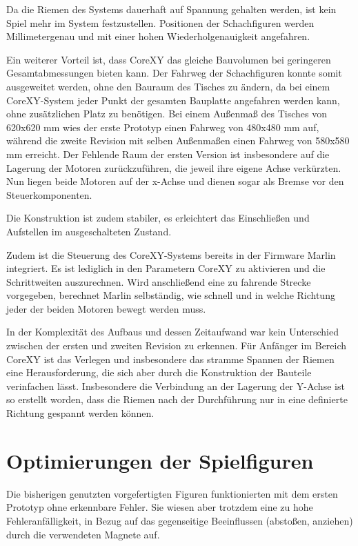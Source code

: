 Da die Riemen des Systems dauerhaft auf Spannung gehalten werden, ist
kein Spiel mehr im System festzustellen. Positionen der Schachfiguren
werden Millimetergenau und mit einer hohen Wiederholgenauigkeit
angefahren.

Ein weiterer Vorteil ist, dass CoreXY das gleiche Bauvolumen bei
geringeren Gesamtabmessungen bieten kann. Der Fahrweg der Schachfiguren
konnte somit ausgeweitet werden, ohne den Bauraum des Tisches zu ändern,
da bei einem CoreXY-System jeder Punkt der gesamten Bauplatte angefahren
werden kann, ohne zusätzlichen Platz zu benötigen. Bei einem Außenmaß
des Tisches von 620x620 mm wies der erste Prototyp einen Fahrweg von
480x480 mm auf, während die zweite Revision mit selben Außenmaßen einen
Fahrweg von 580x580 mm erreicht. Der Fehlende Raum der ersten Version
ist insbesondere auf die Lagerung der Motoren zurückzuführen, die jeweil
ihre eigene Achse verkürzten. Nun liegen beide Motoren auf der x-Achse
und dienen sogar als Bremse vor den Steuerkomponenten.

Die Konstruktion ist zudem stabiler, es erleichtert das Einschließen und
Aufstellen im ausgeschalteten Zustand.

Zudem ist die Steuerung des CoreXY-Systems bereits in der Firmware
Marlin integriert. Es ist lediglich in den Parametern CoreXY zu
aktivieren und die Schrittweiten auszurechnen. Wird anschließend eine zu
fahrende Strecke vorgegeben, berechnet Marlin selbständig, wie schnell
und in welche Richtung jeder der beiden Motoren bewegt werden muss.

In der Komplexität des Aufbaus und dessen Zeitaufwand war kein
Unterschied zwischen der ersten und zweiten Revision zu erkennen. Für
Anfänger im Bereich CoreXY ist das Verlegen und insbesondere das stramme
Spannen der Riemen eine Herausforderung, die sich aber durch die
Konstruktion der Bauteile verinfachen lässt. Insbesondere die Verbindung
an der Lagerung der Y-Achse ist so erstellt worden, dass die Riemen nach
der Durchführung nur in eine definierte Richtung gespannt werden können.

\hypertarget{optimierungen-der-spielfiguren}{%
\section{Optimierungen der
Spielfiguren}\label{optimierungen-der-spielfiguren}}

Die bisherigen genutzten vorgefertigten Figuren funktionierten mit dem
ersten Prototyp ohne erkennbare Fehler. Sie wiesen aber trotzdem eine zu
hohe Fehleranfälligkeit, in Bezug auf das gegenseitige Beeinflussen
(abstoßen, anziehen) durch die verwendeten Magnete auf.

